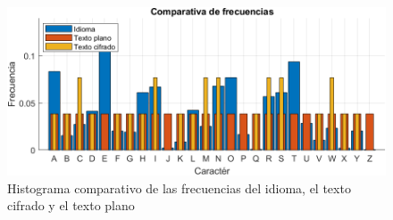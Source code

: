 \documentclass[10pt]{article}
\begin{document}
\begin{figure}[!ht]
  \centering
  \includegraphics[width=1\textwidth]{histogramaCiphed.png}
  \caption{Histograma comparativo de las frecuencias del idioma, el texto cifrado y el texto plano}
  \label{fig_sim}
\end{figure}
\newpage
\end{document}
